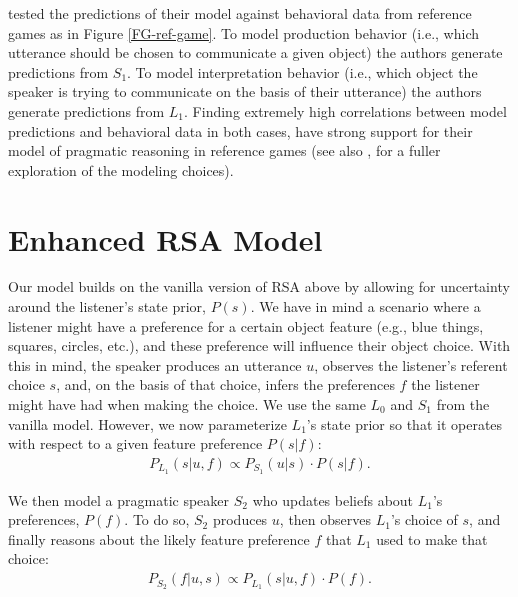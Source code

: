 \documentclass[10pt,a4paper]{article}
\begin{document}
 tested the predictions of their model against behavioral data from reference games as in Figure \ref{FG-ref-game}. To model production behavior (i.e., which utterance should be chosen to communicate a given object) the authors generate predictions from $S_1$. To model interpretation behavior (i.e., which object the speaker is trying to communicate on the basis of their utterance) the authors generate predictions from $L_1$. Finding extremely high correlations between model predictions and behavioral data in both cases, \citeauthor{frankgoodman2012} have strong support for their model of pragmatic reasoning in reference games (see also , for a fuller exploration of the modeling choices).


\section{Enhanced RSA Model}
Our model builds on the vanilla version of RSA above by allowing for uncertainty around the listener's state prior, $P(s)$. We have in mind a scenario where a listener might have a preference for a certain object feature (e.g., blue things, squares, circles, etc.), and these preference will influence their object choice.
With this in mind, the speaker produces an utterance $u$, observes the listener's referent choice $s$, and, on the basis of that choice, infers the preferences $f$ the listener might have had when making the choice.
We use the same $L_0$ and $S_1$ from the vanilla model. However, we now parameterize $L_1$'s state prior so that it operates with respect to a given feature preference $P(s|f)$:
\begin{gather}
P_{L_{1}}(s|u,f) \propto P_{S_{1}}(u|s) \cdot P(s|f).
\end{gather}

We then model a pragmatic speaker $S_2$ who updates beliefs about $L_1$'s preferences, $P(f)$. To do so, $S_2$ produces $u$, then observes $L_1$'s choice of $s$, and finally reasons about the likely feature preference $f$ that $L_1$ used to make that choice:
\begin{gather}
P_{S_{2}}(f|u,s) \propto P_{L_{1}}(s|u,f) \cdot P(f).
\end{gather}
\end{document}
